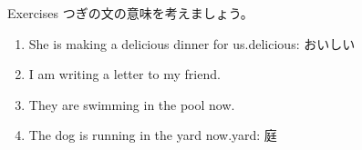 \documentclass[aspectratio=169,xcolor={dvipsnames,table}]{beamer}
\newcommand{\myaudio}[1]{\href{#1}{\faVolumeUp}}
\begin{document}
\begin{frame}[plain]{Exercises}
つぎの文の意味を考えましょう。

\begin{enumerate}
 \item She is making a delicious dinner for us.\hfill{\small delicious: おいしい}
 \item I am writing a letter to my friend.
 \item They are swimming in the pool now.
 \item The dog is running in the yard now.\hfill{\small yard: 庭}
\end{enumerate} 

\pause

\mbox{}\hfill\myaudio{./audio/021_is_ing_intro_04.mp3}
\end{frame}
\end{document}
